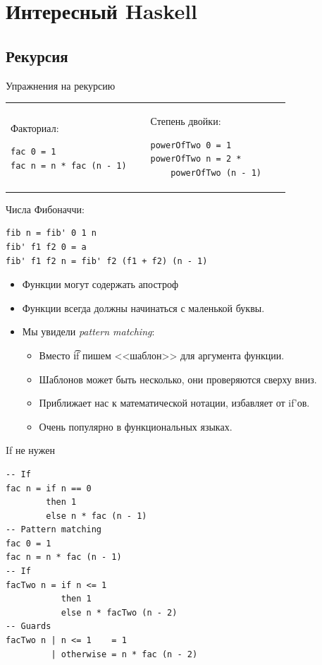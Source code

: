\section{Интересный Haskell}
\subsection{Рекурсия}

\begin{frame}
\end{frame}

\begin{frame}[t,fragile]{Упражнения на рекурсию}
	\begin{tabular}{p{0.45\linewidth}p{0.45\linewidth}}
	\centering
	Факториал:
\begin{verbatim}
fac 0 = 1
fac n = n * fac (n - 1)
\end{verbatim}
	&
	Степень двойки: \pause
\begin{verbatim}
powerOfTwo 0 = 1
powerOfTwo n = 2 *
    powerOfTwo (n - 1)
\end{verbatim}
	\end{tabular}
	\vspace{-10pt}

	Числа Фибоначчи: \pause
\begin{verbatim}
fib n = fib' 0 1 n
fib' f1 f2 0 = a
fib' f1 f2 n = fib' f2 (f1 + f2) (n - 1)
\end{verbatim}
	\begin{itemize}
		\item Функции могут содержать апостроф
		\item Функции всегда должны начинаться с маленькой буквы.
		\item Мы увидели \textit{pattern matching}:
			\begin{itemize}
				\item Вместо \t{if} пишем <<шаблон>> для аргумента функции.
				\item Шаблонов может быть несколько, они проверяются сверху вниз.
				\item Приближает нас к математической нотации, избавляет от if'ов.
				\item Очень популярно в функциональных языках.
			\end{itemize}
	\end{itemize}
\end{frame}

\begin{frame}[fragile]{If не нужен}
\begin{verbatim}
-- If
fac n = if n == 0
        then 1
        else n * fac (n - 1)
-- Pattern matching
fac 0 = 1
fac n = n * fac (n - 1)
-- If
facTwo n = if n <= 1
           then 1
           else n * facTwo (n - 2)
-- Guards
facTwo n | n <= 1    = 1
         | otherwise = n * fac (n - 2)
\end{verbatim}
\end{frame}

